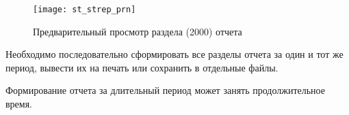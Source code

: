 \begin{figure}[h!]\centering
   \texttt{[image: st\_strep\_prn]}
   \caption{Предварительный просмотр раздела (2000) отчета}
   \label{img_st_strep_prn}
\end{figure}

Необходимо последовательно сформировать все разделы отчета за один и тот же период, вывести их на печать или сохранить в отдельные файлы.

\begin{vnim} 
Формирование отчета за длительный период может занять продолжительное время.
\end{vnim}